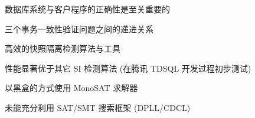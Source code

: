 
\begin{frame}{}
\end{frame}

\begin{frame}{}
\end{frame}

\begin{frame}{}
	\begin{center}
		数据库系统与客户程序的正确性是至关重要的


		{\small 三个事务一致性验证问题之间的递进关系}
	\end{center}
\end{frame}

\begin{frame}{}
  \begin{center}
     高效的快照隔离检测算法与工具~

  \end{center}
\end{frame}

\begin{frame}{}
  \begin{center}
  \end{center}
\end{frame}

\begin{frame}{}
	\centerline{性能显著优于其它 SI 检测算法 (在腾讯 TDSQL 开发过程初步测试)}

\end{frame}

\begin{frame}{}
	\begin{center}
		\polysi{} 以黑盒的方式使用 MonoSAT 求解器

		\vspace{0.30cm}
		\vspace{0.30cm}

		未能充分利用 SAT/SMT 搜索框架 (DPLL/CDCL)
	\end{center}
\end{frame}

